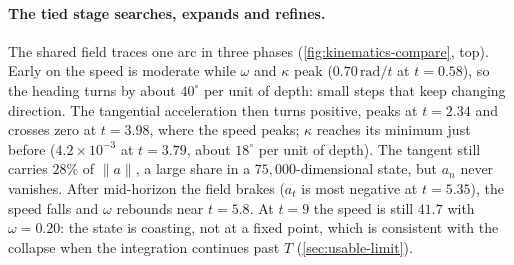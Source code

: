\begin{table}[t]
    \centering
    \caption{Stage-3 kinematics ($R{=}100$, $N{=}500$, massive channel removed).
    Untied values inside blocks; sign flips: share of coordinates of $v$ that change
    sign across one micro-step.}
    \label{tab:kinematics}
    \small
    \setlength{\tabcolsep}{3pt}
\end{table}

\paragraph{The tied stage searches, expands and refines.}
The shared field traces one arc in three phases (\cref{fig:kinematics-compare}, top).
Early on the speed is moderate while $\omega$ and $\kappa$ peak
($0.70\,\mathrm{rad}/t$ at $t{=}0.58$), so the heading turns by about $40^\circ$ per
unit of depth: small steps that keep changing direction.
The tangential acceleration then turns positive, peaks at $t{=}2.34$ and crosses zero
at $t{=}3.98$, where the speed peaks; $\kappa$ reaches its minimum just before
($4.2{\times}10^{-3}$ at $t{=}3.79$, about $18^\circ$ per unit of depth).
The tangent still carries $28\%$ of $\|a\|$, a large share in a $75{,}000$-dimensional
state, but $a_n$ never vanishes.
After mid-horizon the field brakes ($a_t$ is most negative at $t{=}5.35$), the speed
falls and $\omega$ rebounds near $t{=}5.8$.
At $t{=}9$ the speed is still $41.7$ with $\omega{=}0.20$: the state is coasting, not
at a fixed point, which is consistent with the collapse when the integration continues
past $T$ (\cref{sec:usable-limit}).

